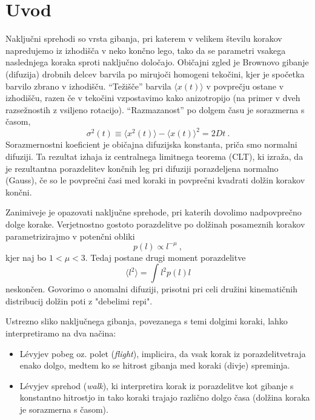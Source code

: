 \documentclass{article}
\begin{document}
\section{Uvod}
Naključni sprehodi so vrsta gibanja, pri katerem
v velikem številu korakov napredujemo iz izhodišča
v neko končno lego, tako da se parametri vsakega naslednjega
koraka sproti naključno določajo.  Običajni zgled
je Brownovo gibanje (difuzija) drobnih delcev barvila
po mirujoči homogeni tekočini, kjer je spočetka barvilo
zbrano v izhodišču.  ``Težišče'' barvila
$\langle x(t)\rangle$ v povprečju ostane v izhodišču,
razen če v tekočini vzpostavimo kako anizotropijo (na primer
v dveh razsežnostih z vsiljeno rotacijo).  ``Razmazanost''
po dolgem času je sorazmerna s časom,
\begin{equation*}
  \sigma^2(t) \equiv \langle x^2(t)\rangle - \langle x(t)\rangle^2 = 2 D t \>.
\end{equation*}
Sorazmernostni koeficient je običajna difuzijska konstanta,
priča smo normalni difuziji.  Ta rezultat izhaja iz
centralnega limitnega teorema (CLT), ki izraža,
da je rezultantna porazdelitev končnih leg pri difuziji
porazdeljena normalno (Gauss), če so le povprečni časi
med koraki in povprečni kvadrati dolžin korakov končni.

Zanimiveje je opazovati naključne sprehode, pri katerih dovolimo
nadpovprečno dolge korake.  Verjetnostno gostoto porazdelitve
po dolžinah posameznih korakov parametrizirajmo v potenčni obliki
\begin{equation}
p(l) \propto l^{-\mu} \>,
\label{lpow}
\end{equation}
kjer naj bo $1 < \mu < 3$.  Tedaj postane drugi moment porazdelitve
\begin{equation*}
  \langle l^2\rangle = \int l^2 p(l) l
\end{equation*}
neskončen.  Govorimo o anomalni difuziji, prisotni pri celi dru\v zini
kinematičnih distribucij dolžin poti z "debelimi repi".

Ustrezno sliko naključnega gibanja, povezanega s temi dolgimi koraki, lahko
interpretiramo na dva načina:
\begin{itemize}
  \item L\'evyjev pobeg oz. polet ({\sl flight\/}), implicira, da vsak korak iz
  porazdelitvetraja enako dolgo, medtem ko se hitrost gibanja med koraki (divje) spreminja.
  \item L\'evyjev sprehod ({\sl walk\/}), ki interpretira korak iz porazdelitve kot  gibanje s konstantno hitrostjo in
  tako koraki trajajo različno dolgo časa (dolžina koraka je sorazmerna s časom).
\end{itemize}
\end{document}
